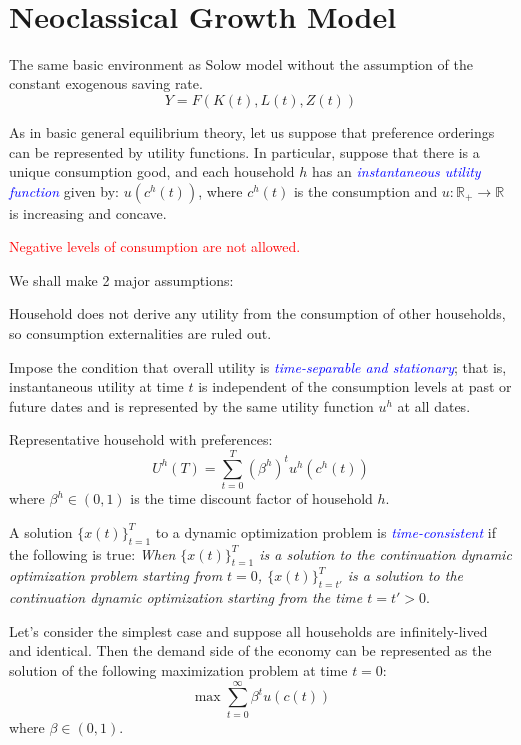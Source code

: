\documentclass{article}
\begin{document}
\

\section{Neoclassical Growth Model}


The same basic environment as Solow model without the assumption of the constant exogenous saving rate.
\[ Y = F(K(t), L(t), Z(t)) \]

As in basic general equilibrium theory, let us suppose that preference orderings can be represented by utility functions. In particular, suppose that there is a unique consumption good, and each household $h$ has an \textit{\textcolor{blue}{instantaneous utility function}} given by: $u(c^h(t))$, where $c^h(t)$ is the consumption and $u : \mathbb{R}_+ \rightarrow \mathbb{R}$ is increasing and concave.

\begin{note}
\textcolor{red}{Negative levels of consumption are not allowed.}
\end{note}

We shall make 2 major assumptions:

\begin{description}[nosep]
\item[] Household does not derive any utility from the consumption of other households, so consumption externalities are ruled out.
\item[] Impose the condition that overall utility is \textcolor{blue}{\textit{time-separable and stationary}}; that is, instantaneous utility at time $t$ is independent of the consumption levels at past or future dates and is represented by the same utility function $u^h$ at all dates.
\end{description}

Representative household with preferences:
\[ U^h(T) = \sum_{t = 0}^T (\beta^h)^t u^h(c^h(t)) \]
where $\beta^h \in (0, 1)$ is the time discount factor of household $h$.

A solution $\{x(t)\}_{t = 1}^T$ to a dynamic optimization problem is \textit{\textcolor{blue}{time-consistent}} if the following is true: \textit{When $\{x(t)\}_{t = 1}^T$ is a solution to the continuation dynamic optimization problem starting from $t = 0$, $\{x(t)\}_{t = t'}^T$ is a solution to the continuation dynamic optimization starting from the time $t = t' > 0$}.

Let's consider the simplest case and suppose all households are infinitely-lived and identical. Then the demand side of the economy can be represented as the solution of the following maximization problem at time $t = 0$:
\[ \max \sum_{t = 0}^{\infty} \beta^t u(c(t)) \]
where $\beta \in (0, 1)$.
\end{document}
